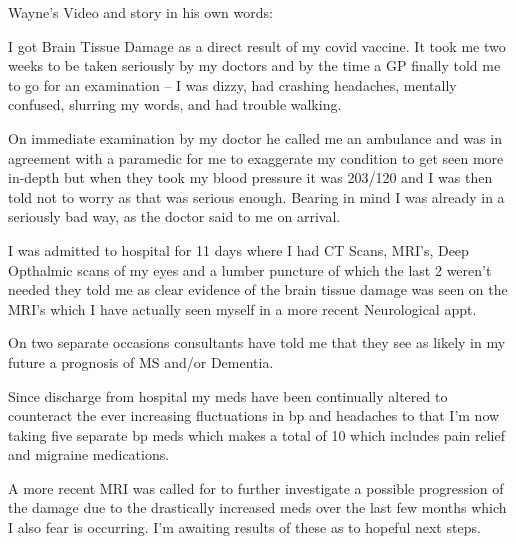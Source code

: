 Wayne’s Video and story in his own words:

I got Brain Tissue Damage as a direct result of my covid vaccine. It took me two
weeks to be taken seriously by my doctors and by the time a GP finally told me
to go for an examination – I was dizzy, had crashing headaches, mentally
confused, slurring my words, and had trouble walking.

On immediate examination by my doctor he called me an ambulance and was in
agreement with a paramedic for me to exaggerate my condition to get seen more
in-depth but when they took my blood pressure it was 203/120 and I was then told
not to worry as that was serious enough. Bearing in mind I was already in a
seriously bad way, as the doctor said to me on arrival.

I was admitted to hospital for 11 days where I had CT Scans, MRI’s, Deep
Opthalmic scans of my eyes and a lumber puncture of which the last 2 weren’t
needed they told me as clear evidence of the brain tissue damage was seen on the
MRI’s which I have actually seen myself in a more recent Neurological appt.

On two separate occasions consultants have told me that they see as likely in my
future a prognosis of MS and/or Dementia.

Since discharge from hospital my meds have been continually altered to
counteract the ever increasing fluctuations in bp and headaches to that I’m now
taking five separate bp meds which makes a total of 10 which includes pain
relief and migraine medications.

A more recent MRI was called for to further investigate a possible progression
of the damage due to the drastically increased meds over the last few months
which I also fear is occurring. I’m awaiting results of these as to hopeful next
steps.
